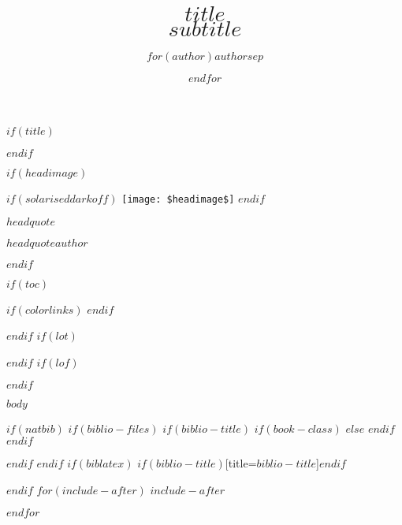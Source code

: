\documentclass[$if(fontsize)$$fontsize$,$endif$$if(lang)$$babel-lang$,$endif$$if(papersize)$$papersize$paper,$endif$$for(classoption)$$classoption$$sep$,$endfor$]{tufte-handout}
\date{}
\title{$title$ \\ \small $subtitle$}
\author{$for(author)$$author$$sep$ \and $endfor$}
\newcommand\crule[3][black]{\textcolor{#1}{\rule{#2}{#3}}}
\begin{document}
$if(title)$
\maketitle
$endif$




$if(headimage)$
\begin{marginfigure}
$if(solariseddarkoff)$
\texttt{[image: \$headimage\$]}
$endif$
\epigraph{$headquote$}{\textit{$headquoteauthor$}}
\end{marginfigure}
$endif$




$if(toc)$
{
$if(colorlinks)$
\hypersetup{linkcolor=$if(toccolor)$$toccolor$$else$black$endif$}
$endif$
\setcounter{tocdepth}{$toc-depth$}
\tableofcontents
}
$endif$
$if(lot)$
\listoftables
$endif$
$if(lof)$
\listoffigures
$endif$

$body$



$if(natbib)$
$if(biblio-files)$
$if(biblio-title)$
$if(book-class)$
\renewcommand\bibname{$biblio-title$}
$else$
\renewcommand\refname{$biblio-title$}
$endif$
$endif$



$endif$
$endif$
$if(biblatex)$
\printbibliography$if(biblio-title)$[title=$biblio-title$]$endif$

$endif$
$for(include-after)$
$include-after$

$endfor$
\end{document}
